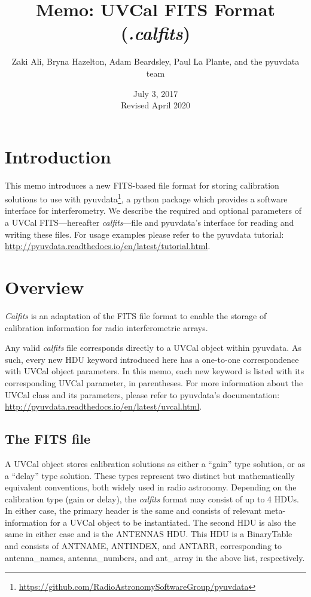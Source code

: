 \documentclass[11pt, oneside]{article}   	%
\title{Memo: UVCal FITS Format (\emph{.calfits})}
\author{Zaki Ali, Bryna Hazelton, Adam Beardsley, Paul La Plante, and the pyuvdata team}
\date{July 3, 2017\\
 Revised April 2020}
\begin{document}
\maketitle
\section{Introduction}
This memo introduces a new FITS-based file format for storing calibration solutions to use with pyuvdata\footnote{\url{https://github.com/RadioAstronomySoftwareGroup/pyuvdata}}, a python package which
provides a software interface for interferometry.
We describe the required and optional parameters of a UVCal FITS---hereafter \textit{calfits}---file and pyuvdata's interface for reading and writing these files. 
For usage examples please refer to the pyuvdata tutorial: \url{http://pyuvdata.readthedocs.io/en/latest/tutorial.html}.

\section{Overview}
\textit{Calfits} is an adaptation of the FITS file format to enable the storage of calibration information for radio interferometric arrays. %

Any valid \textit{calfits} file corresponds directly to a UVCal object within pyuvdata.
As such, every new HDU keyword introduced here has a one-to-one correspondence with UVCal object parameters.
In this memo, each new keyword is listed with its corresponding UVCal parameter, in parentheses. %
For more information about the UVCal class and its parameters, please refer to pyuvdata's documentation: \url{http://pyuvdata.readthedocs.io/en/latest/uvcal.html}.

\subsection{The FITS file}

A UVCal object stores calibration solutions as either a ``gain'' type solution, or as a ``delay'' type solution.
These types represent two distinct but mathematically equivalent conventions, both widely used in radio astronomy.
Depending on the calibration type (gain or delay), the \textit{calfits} format may consist of up to 4 HDUs. 
In either case, the primary header is the same and consists of relevant meta-information for a UVCal object to be instantiated.
The second HDU is also the same in either case and is the ANTENNAS HDU. 
This HDU is a BinaryTable and consists of ANTNAME, ANTINDEX, and ANTARR, corresponding to antenna\_names, antenna\_numbers, and ant\_array in the above list, respectively. %
\end{document}
